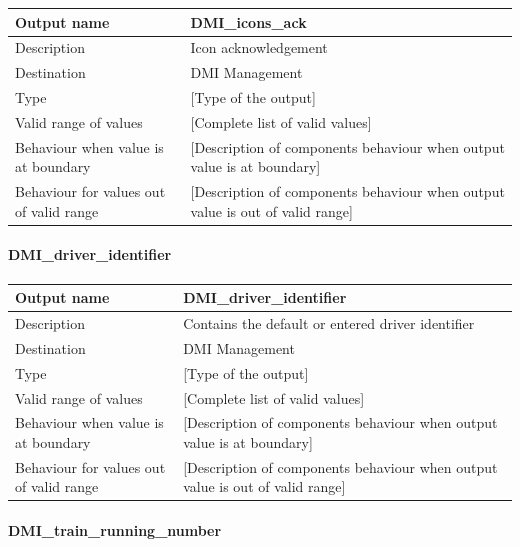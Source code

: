 \begin{longtable}{p{}p{}}
\toprule
Output name				& DMI\_icons\_ack \\
\midrule
Description				& Icon acknowledgement \\
\midrule
Destination				& DMI Management \\ 
\midrule
Type					& [Type of the output] \\
\midrule
Valid range of values	& [Complete list of valid values] \\
\midrule
Behaviour when value is at boundary	& [Description of components behaviour when output value is at boundary] \\
\midrule
Behaviour for values out of valid range	& [Description of components behaviour when output value is out of valid range] \\
\bottomrule
\end{longtable}


\paragraph{DMI\_driver\_identifier}

\begin{longtable}{p{}p{}}
\toprule
Output name				& DMI\_driver\_identifier \\
\midrule
Description				&  Contains the default or entered driver identifier \\
\midrule
Destination				& DMI Management \\ 
\midrule
Type					& [Type of the output] \\
\midrule
Valid range of values	& [Complete list of valid values] \\
\midrule
Behaviour when value is at boundary	& [Description of components behaviour when output value is at boundary] \\
\midrule
Behaviour for values out of valid range	& [Description of components behaviour when output value is out of valid range] \\
\bottomrule
\end{longtable}

\paragraph{DMI\_train\_running\_number}

